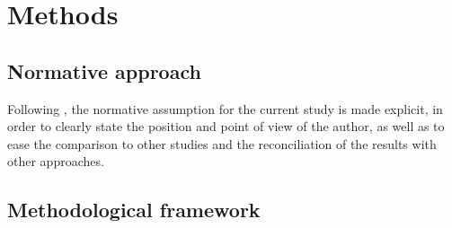 \chapter{Methods}
\label{c:methods}

\section{Normative approach}
\label{s:methods:normative-approach}
Following \textcite{creutzig2015_EvolvingNarrativesLow}, the normative assumption for the current study is made explicit, in order to clearly state the position and point of view of the author, as well as to ease the comparison to other studies and the reconciliation of the results with other approaches.



\section{Methodological framework}
\label{s:methods:framework}


